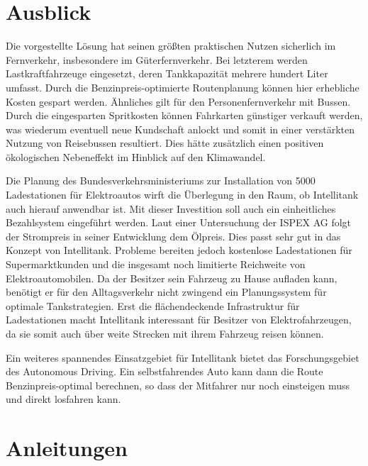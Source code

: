 \documentclass[
ngerman          %
,a4paper          %
,11pt
,pdftex
]{report}
\begin{document}
\chapter{Ausblick}
Die vorgestellte Lösung hat seinen größten praktischen Nutzen sicherlich im Fernverkehr, insbesondere im Güterfernverkehr. Bei letzterem werden Lastkraftfahrzeuge eingesetzt, deren Tankkapazität mehrere hundert Liter umfasst. Durch die Benzinpreis-optimierte Routenplanung können hier erhebliche Kosten gespart werden. Ähnliches gilt für den Personenfernverkehr mit Bussen. Durch die eingesparten Spritkosten können Fahrkarten günstiger verkauft werden, was wiederum eventuell neue Kundschaft anlockt und somit in einer verstärkten Nutzung von Reisebussen resultiert. Dies hätte zusätzlich einen positiven ökologischen Nebeneffekt im Hinblick auf den Klimawandel. \\
\par
Die Planung des Bundesverkehrsministeriums zur Installation von 5000 Ladestationen für Elektroautos \cite{ladestations-planung} wirft die Überlegung in den Raum, ob Intellitank auch hierauf anwendbar ist. Mit dieser Investition soll auch ein einheitliches Bezahlsystem eingeführt werden. Laut einer Untersuchung der ISPEX AG \cite{oel-strom} folgt der Strompreis in seiner Entwicklung dem Ölpreis. Dies passt sehr gut in das Konzept von Intellitank. Probleme bereiten jedoch kostenlose Ladestationen für Supermarktkunden und die insgesamt noch limitierte Reichweite von Elektroautomobilen. Da der Besitzer sein Fahrzeug zu Hause aufladen kann, benötigt er für den Alltagsverkehr nicht zwingend ein Planungssystem für optimale Tankstrategien. Erst die flächendeckende Infrastruktur für Ladestationen macht Intellitank interessant für Besitzer von Elektrofahrzeugen, da sie somit auch über weite Strecken mit ihrem Fahrzeug reisen können. \\
\par 
Ein weiteres spannendes Einsatzgebiet für Intellitank bietet das Forschungsgebiet des Autonomous Driving. Ein selbstfahrendes Auto kann dann die Route Benzinpreis-optimal berechnen, so dass der Mitfahrer nur noch einsteigen muss und direkt losfahren kann. 

\newpage
\appendix

\chapter{Anleitungen}
\end{document}

